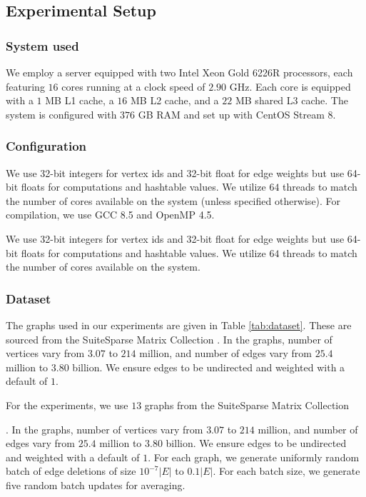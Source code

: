 \subsection{Experimental Setup}
\label{sec:setup}

\subsubsection{System used}

We employ a server equipped with two Intel Xeon Gold 6226R processors, each featuring $16$ cores running at a clock speed of $2.90$ GHz. Each core is equipped with a $1$ MB L1 cache, a $16$ MB L2 cache, and a $22$ MB shared L3 cache. The system is configured with $376$ GB RAM and set up with CentOS Stream 8.


\subsubsection{Configuration}

We use 32-bit integers for vertex ids and 32-bit float for edge weights but use 64-bit floats for computations and hashtable values. We utilize $64$ threads to match the number of cores available on the system (unless specified otherwise). For compilation, we use GCC 8.5 and OpenMP 4.5.

We use 32-bit integers for vertex ids and 32-bit float for edge weights but use 64-bit floats for computations and hashtable values. We utilize $64$ threads to match the number of cores available on the system.


\subsubsection{Dataset}

The graphs used in our experiments are given in Table \ref{tab:dataset}. These are sourced from the SuiteSparse Matrix Collection \cite{suite19}. In the graphs, number of vertices vary from $3.07$ to $214$ million, and number of edges vary from $25.4$ million to $3.80$ billion. We ensure edges to be undirected and weighted with a default of $1$.

For the experiments, we use $13$ graphs from the SuiteSparse Matrix Collection. In the graphs, number of vertices vary from $3.07$ to $214$ million, and number of edges vary from $25.4$ million to $3.80$ billion. We ensure edges to be undirected and weighted with a default of $1$. For each graph, we generate uniformly random batch of edge deletions of size $10^{-7} |E|$ to $0.1 |E|$. For each batch size, we generate five random batch updates for averaging.

